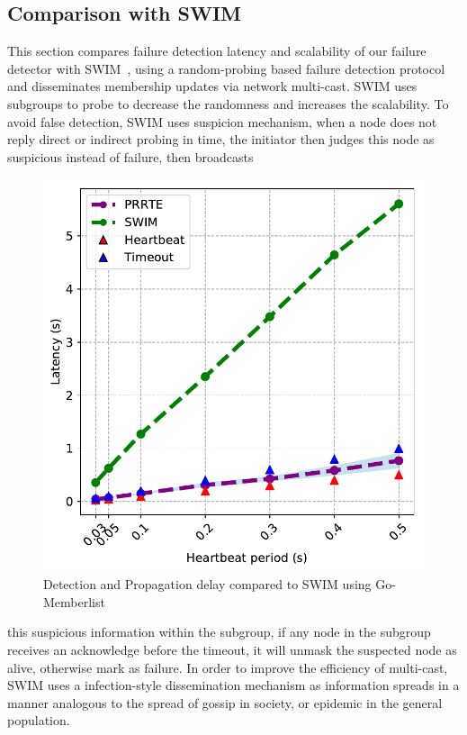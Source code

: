 \documentclass[sigconf]{acmart}
\begin{document}
\subsection{Comparison with SWIM}
This section compares failure detection latency and scalability of our failure detector with SWIM~\cite{Abhinandan02}, using a random-probing based failure detection protocol and disseminates membership updates via network multi-cast. SWIM uses subgroups to probe to decrease the randomness and increases the scalability. To avoid false detection, SWIM uses suspicion mechanism, when a node does not reply direct or indirect probing in time, the initiator then judges this node as suspicious instead of failure, then broadcasts
\begin{figure}[h]
  \centering
  \includegraphics[width=\linewidth]{HB_prrte_swim.pdf}
  \caption{Detection and Propagation delay compared to SWIM using Go-Memberlist}
\end{figure}
this suspicious information within the subgroup, if any node in the subgroup receives an acknowledge before the timeout, it will unmask the suspected node as alive, otherwise mark as failure. In order to improve the efficiency of multi-cast, SWIM uses a infection-style dissemination mechanism as information spreads in a manner analogous to the spread of gossip in society, or epidemic in the general population.
\end{document}
